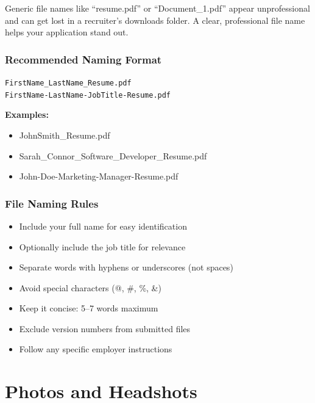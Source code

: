 \documentclass[11pt,a4paper]{article}
\begin{document}
\begin{keystat}
Generic file names like ``resume.pdf'' or ``Document\_1.pdf'' appear unprofessional and can get lost in a recruiter's downloads folder. A clear, professional file name helps your application stand out.
\end{keystat}

\subsubsection{Recommended Naming Format}

\texttt{FirstName\_LastName\_Resume.pdf} \\
\texttt{FirstName-LastName-JobTitle-Resume.pdf}

\textbf{Examples:}
\begin{itemize}
    \item JohnSmith\_Resume.pdf
    \item Sarah\_Connor\_Software\_Developer\_Resume.pdf
    \item John-Doe-Marketing-Manager-Resume.pdf
\end{itemize}

\subsubsection{File Naming Rules}

\begin{bestpractice}
\begin{itemize}[noitemsep]
    \item Include your full name for easy identification
    \item Optionally include the job title for relevance
    \item Separate words with hyphens or underscores (not spaces)
    \item Avoid special characters (@, \#, \%, \&)
    \item Keep it concise: 5--7 words maximum
    \item Exclude version numbers from submitted files
    \item Follow any specific employer instructions
\end{itemize}
\end{bestpractice}

\section{Photos and Headshots}
\end{document}
